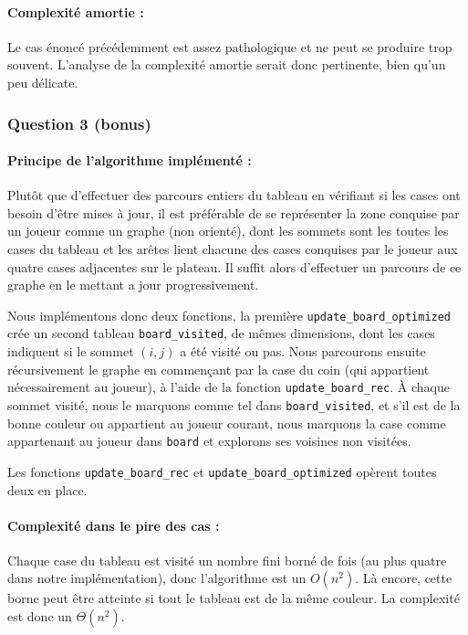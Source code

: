 \documentclass[12pt,a4paper,twoside]{article}
\begin{document}
\paragraph*{Complexité amortie :}
\label{sec:orgheadline4}
Le cas énoncé précédemment est assez pathologique et ne peut se
produire trop souvent. L'analyse de la complexité amortie serait donc
pertinente, bien qu'un peu délicate.
\subsubsection*{Question 3 (bonus)}
\label{sec:orgheadline8}
\paragraph*{Principe de l'algorithme implémenté :}
\label{sec:orgheadline6}
Plutôt que d'effectuer des parcours entiers du tableau en vérifiant si
les cases ont besoin d'être mises à jour, il est préférable de se
représenter la zone conquise par un joueur comme un graphe (non
orienté), dont les sommets sont les toutes les cases du tableau et les
arêtes lient chacune des cases conquises par le joueur aux quatre
cases adjacentes sur le plateau. Il suffit alors d'effectuer un
parcours de ce graphe en le mettant a jour progressivement. 

Nous implémentons donc deux fonctions, la première
\texttt{update\_board\_optimized} crée un second tableau
\texttt{board\_visited}, de mêmes dimensions, dont les cases indiquent
si le sommet \((i,j)\)
a été visité ou pas.  Nous parcourons ensuite récursivement le graphe
en commençant par la case du coin (qui appartient nécessairement au
joueur), à l'aide de la fonction \texttt{update\_board\_rec}.  À
chaque sommet visité, nous le marquons comme tel dans
\texttt{board\_visited}, et s'il est de la bonne couleur ou appartient
au joueur courant, nous marquons la case comme appartenant au joueur
dans \texttt{board} et explorons ses voisines non visitées.

Les fonctions \texttt{update\_board\_rec} et
\texttt{update\_board\_optimized} opèrent toutes deux en place.
\paragraph*{Complexité dans le pire des cas :}
\label{sec:orgheadline7}
Chaque case du tableau est visité un nombre fini borné de fois (au
plus quatre dans notre implémentation), donc l'algorithme est un
\(O(n^{2})\). 
Là encore, cette borne peut être atteinte si tout le tableau
est de la même couleur. La complexité est donc un \(\Theta(n^{2})\).
\end{document}
